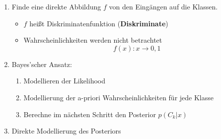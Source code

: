 	\begin{enumerate}
		\item Finde eine direkte Abbildung $f$ von den Eingängen auf die Klassen.
		\begin{itemize}
			\item $f$ heißt Diskriminatenfunktion (\textbf{Diskriminate})
			\item Wahrscheinlichkeiten werden nicht betrachtet
			\begin{equation*}
				f(x): x \rightarrow 0,1
			\end{equation*}
		\end{itemize}
		\item Bayes'scher Ansatz:
		\begin{enumerate}
			\item Modellieren der Likelihood
			\item Modellierung der a-priori Wahrscheinlichkeiten für jede Klasse
			\item Berechne im nächsten Schritt den Posterior $p(C_k\vert x)$
		\end{enumerate}
		\item Direkte Modellierung des Posteriors
	\end{enumerate}
